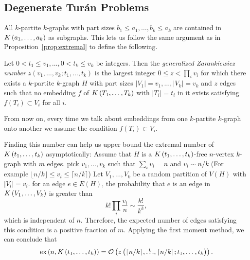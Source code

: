 

\subsection{Degenerate Turán Problems}\label{subsec:degenerate}

\begin{remark}
    All $k$-partite $k$-graphs with part sizes $b_1 \leq a_1, \dots, b_k \leq a_k$
    are contained in $K\left(a_1, \dots, a_k\right)$ as subgraphs.
    This lets us follow the same argument as in Proposition~\ref{prop:extremal}
    to define the following.
\end{remark}

\begin{definition}\label{def:zarankiewicz}
    Let $0 < t_1 \leq v_1, \dots, 0 < t_k \leq v_k$ be integers.
    Then the \emph{generalized Zarankiewicz number} $z(v_1, \dots, v_k; t_1, \dots, t_k)$
    is the largest integer $0 \leq z < \prod_i{ v_i}$ for which there exists a $k$-partite $k$-graph
    $H$ with part sizes $ |V_1| = v_1, \dots, |V_k| = v_k$ and $z$ edges
    such that no embedding $f$ of $K\left(T_1, \dots, T_k\right)$ with $|T_i| = t_i$ in it exists
    satisfying $f(T_i) \subset V_i$ for all $i$.
\end{definition}

From now on, every time we talk about embeddings from one $k$-partite $k$-graph
onto another we assume the condition $f(T_i) \subset V_i$.

\begin{remark}\label{rem:zar_vs_turan}
    Finding this number can help us upper bound the extremal number of $K\left(t_1, \dots, t_k\right)$ asymptotically:
    Assume that $H$ is a $K\left(t_1, \dots, t_k\right)$-free $n$-vertex $k$-graph with $m$ edges.
    pick $v_1, \dots, v_k$ such that $\sum_{i} v_i = n $ and $v_i \sim n/k $
    (For example $\lfloor n/k \rfloor \leq v_i \leq \lceil n/k \rceil$)
    Let $V_1, \dots, V_k$ be a random partition of $V(H)$ with $|V_i| = v_i$.
    for an edge $e \in E(H)$, the probability that $e$ is an edge in $K\left(V_1, \dots, V_k\right)$ is
    greater than
    \[k! \prod_i \frac{v_i}{n} \sim \frac{k!}{k^k},\]
    which is independent of $n$.
    Therefore, the expected number of edges satisfying this condition is a positive fraction of $m$.
    Applying the first moment method, we can conclude that
    \[
        \text{ex} \left( n, K\left(t_1, \dots, t_k\right) \right) = \mathcal{O}\left(z\left(\lceil n / k \rceil, \overset{k}{\dots}, \lceil n / k \rceil; t_1, \dots, t_k\right)\right).
    \]

\end{remark}



